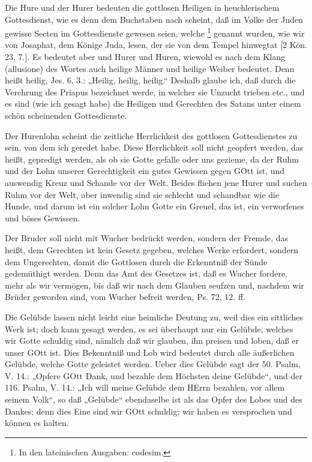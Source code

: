Die Hure und der Hurer bedeuten die gottlosen Heiligen in heuchlerischem Gottesdienst, wie es denn dem Buchstaben nach scheint, daß im Volke der Juden gewisse Secten im Gottesdienste gewesen seien, welche \footnote{In den lateinischen Ausgaben: codesim.} genannt wurden, wie wir von Josaphat, dem Könige Juda, lesen, der sie von dem Tempel hinwegtat [2 Kön. 23, 7.]. Es bedeutet aber  und  Hurer und Huren, wiewohl es nach dem Klang (allusione) des Wortes auch heilige Männer und heilige Weiber bedeutet. Denn  heißt heilig, Jes. 6, 3.: „Heilig, heilig, heilig.“ Deshalb glaube ich, daß durch  die Verehrung des Priapus bezeichnet werde, in welcher sie Unzucht trieben etc., und es sind (wie ich gesagt habe) die Heiligen und Gerechten des Satans unter einem schön scheinenden Gottesdienste.

Der Hurenlohn scheint die zeitliche Herrlichkeit des gottlosen Gottesdienstes zu sein, von dem ich geredet habe. Diese Herrlichkeit soll nicht geopfert werden, das heißt, gepredigt werden, als ob sie Gotte gefalle oder uns gezieme, da der Ruhm und der Lohn unserer Gerechtigkeit ein gutes Gewissen gegen GOtt ist, und auswendig Kreuz und Schande vor der Welt. Beides fliehen jene Hurer und suchen Ruhm vor der Welt, aber inwendig sind sie schlecht und schandbar wie die Hunde, und darum ist ein solcher Lohn Gotte ein Greuel, das ist, ein verworfenes und böses Gewissen.

Der Bruder soll nicht mit Wucher bedrückt werden, sondern der Fremde, das heißt, dem Gerechten ist kein Gesetz gegeben, welches Werke erfordert, sondern dem Ungerechten, damit die Gottlosen durch die Erkenntniß der Sünde gedemüthigt werden. Denn das Amt des Gesetzes ist, daß es Wucher fordere, mehr als wir vermögen, bis daß wir nach dem Glauben seufzen und, nachdem wir Brüder geworden sind, vom Wucher befreit werden, Ps. 72, 12. ff.

Die Gelübde lassen nicht leicht eine heimliche Deutung zu, weil dies ein sittliches Werk ist; doch kann gesagt werden, es sei überhaupt nur ein Gelübde, welches wir Gotte schuldig sind, nämlich daß wir glauben, ihn preisen und loben, daß er unser GOtt ist. Dies Bekenntniß und Lob wird bedeutet durch alle äußerlichen Gelübde, welche Gotte geleistet werden. Ueber dies Gelübde sagt der 50. Psalm, V. 14.: „Opfere GOtt Dank, und bezahle dem Höchsten deine Gelübde“, und der 116. Psalm, V. 14.: „Ich will meine Gelübde dem HErrn bezahlen, vor allem seinem Volk“, so daß „Gelübde“ ebendaselbe ist als das Opfer des Lobes und des Dankes; denn dies Eine sind wir GOtt schuldig; wir haben es versprochen und können es halten.

